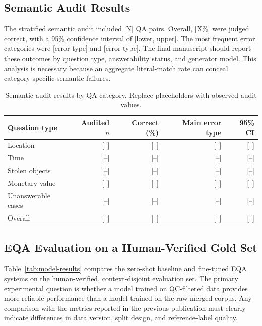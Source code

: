 \documentclass[graybox]{SNmult}
\begin{document}
\subsection{Semantic Audit Results}

The stratified semantic audit included [N] QA pairs. Overall, [X\%] were judged correct, with a 95\% confidence interval of [lower, upper]. The most frequent error categories were [error type] and [error type]. The final manuscript should report these outcomes by question type, answerability status, and generator model. This analysis is necessary because an aggregate literal-match rate can conceal category-specific semantic failures.

\begin{table}[!t]
\caption{Semantic audit results by QA category. Replace placeholders with observed audit values.}
\label{tab:audit-results}
\centering
\small
\begin{tabular}{lrrrr}
\toprule
Question type & Audited $n$ & Correct (\%) & Main error type & 95\% CI \\
\midrule
Location & [--] & [--] & [--] & [--] \\
Time & [--] & [--] & [--] & [--] \\
Stolen objects & [--] & [--] & [--] & [--] \\
Monetary value & [--] & [--] & [--] & [--] \\
Unanswerable cases & [--] & [--] & [--] & [--] \\
Overall & [--] & [--] & [--] & [--] \\
\bottomrule
\end{tabular}
\end{table}

\subsection{EQA Evaluation on a Human-Verified Gold Set}

Table~\ref{tab:model-results} compares the zero-shot baseline and fine-tuned EQA systems on the human-verified, context-disjoint evaluation set. The primary experimental question is whether a model trained on QC-filtered data provides more reliable performance than a model trained on the raw merged corpus. Any comparison with the metrics reported in the previous publication must clearly indicate differences in data version, split design, and reference-label quality.
\end{document}

